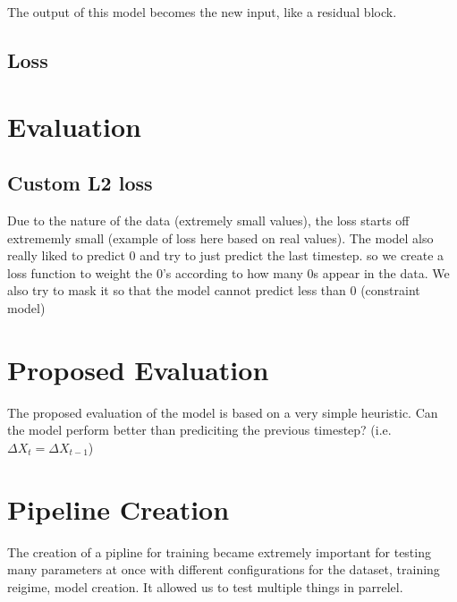 The output of this model  becomes the new input, like a residual block.

\subsection{Loss}

\section{Evaluation}
\subsection{Custom L2 loss}
Due to the nature of the data (extremely small values), the loss starts off extrememly small (example of loss here based on real values). The model also really liked to predict 0 and try to just predict the last timestep. so we create a loss function to weight the 0's according to how many 0s appear in the data. We also try to mask it so that the model cannot predict less than 0 (constraint model)
\section{Proposed Evaluation}
The proposed evaluation of the model is based on a very simple heuristic. Can the model perform better than prediciting the previous timestep? (i.e. $\Delta{X_{t}} = \Delta{X_{t-1}}$)
\section{Pipeline Creation}
The creation of a pipline for training became extremely important for testing many parameters at once with different configurations for the dataset, training reigime, model creation. It allowed us to test multiple things in parrelel.